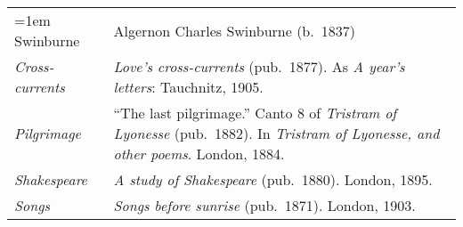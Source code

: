\begin{xltabular}{\textwidth}{ lQ }
\hangindent=1em  Swinburne & Algernon Charles Swinburne (b.~1837) \\
\hspace{1em}\textit{Cross-currents} & \textit{Love's cross-currents} (pub.~1877). As \textit{A year's letters}: Tauchnitz, 1905. \\ %
\hspace{1em}\textit{Pilgrimage} & ``The last pilgrimage.''  Canto 8 of \textit{Tristram of Lyonesse} (pub.~1882). In \textit{Tristram of Lyonesse, and other poems}. London, 1884. \\ 
\hspace{1em}\textit{Shakespeare} & \textit{A study of Shakespeare} (pub.~1880). London, 1895. \\
\hspace{1em}\textit{Songs} & \textit{Songs before sunrise} (pub.~1871). London, 1903. \\


\end{xltabular}

